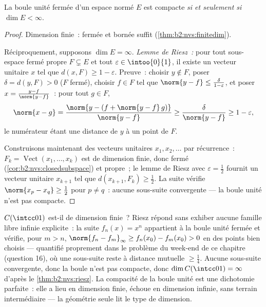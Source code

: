 \begin{theorem}[Riesz]\label{thm:b2:nvs:riesz}
La boule unité fermée d'un espace normé $E$ est compacte \emph{si et
seulement si} $\dim E < \infty$.
\end{theorem}

\begin{proof}
Dimension finie~: fermée et bornée suffit
(\cref{thm:b2:nvs:finitedim}).

Réciproquement, supposons $\dim E = \infty$. \emph{Lemme de Riesz~:}
pour tout sous-espace fermé propre $F \subsetneq E$ et tout $\varepsilon \in
\intoo{0}{1}$, il existe un vecteur unitaire $x$ tel que $d(x, F) \geq 1 -
\varepsilon$. Preuve~: choisir $y \notin F$, poser $\delta = d(y, F) > 0$
($F$ fermé), choisir $f \in F$ tel que $\norm{y - f} \leq
\frac{\delta}{1 - \varepsilon}$, et poser $x = \frac{y - f}{\norm{y -
f}}$~: pour tout $g \in F$,
\[
\norm{x - g} = \frac{\norm{y - (f + \norm{y-f}\,g)}}{\norm{y - f}}
\geq \frac{\delta}{\norm{y-f}} \geq 1 - \varepsilon ,
\]
le numérateur étant une distance de $y$ à un point de $F$.

Construisons maintenant des vecteurs unitaires $x_1, x_2, \dots$ par
récurrence~: $F_k = \operatorname{Vect}(x_1, \dots, x_k)$ est de
dimension finie, donc fermé (\cref{cor:b2:nvs:closedsubspace}) et
propre~; le lemme de Riesz avec $\varepsilon = \frac12$ fournit un
vecteur unitaire $x_{k+1}$ tel que $d(x_{k+1}, F_k) \geq \frac12$. La
suite vérifie $\norm{x_p - x_q} \geq \frac12$ pour $p \neq q$~: aucune
sous-suite convergente --- la boule unité n'est pas compacte.
\end{proof}

\begin{example}\label{ex:b2:nvs:rieszdetector}
$C(\intcc01)$ est-il de dimension finie~? Riesz répond sans exhiber
aucune famille libre infinie explicite~: la suite $f_n(x) = x^n$
appartient à la boule unité fermée et vérifie, pour $m > n$,
$\norm{f_n - f_m}_\infty \geq f_n(x_0) - f_m(x_0) > 0$ en des points
bien choisis --- quantifié proprement dans le problème du week-end de
ce chapitre (question 16), où une sous-suite reste à distance mutuelle
$\geq \frac14$. Aucune sous-suite convergente, donc la boule n'est pas
compacte, donc $\dim C(\intcc01) = \infty$ d'après le
\cref{thm:b2:nvs:riesz}. La compacité de la boule unité est une
dichotomie parfaite~: elle a lieu en dimension finie, échoue en
dimension infinie, sans terrain intermédiaire --- la géométrie seule
lit le type de dimension.
\end{example}


